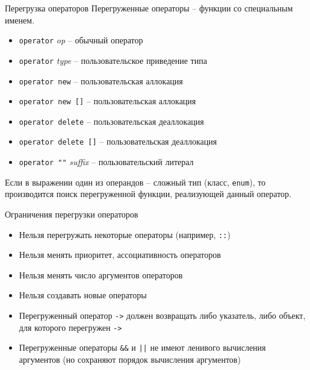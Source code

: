 \documentclass[unknownkeysallowed,xcolor=table]{beamer}
\begin{document}
\begin{frame}{Перегрузка операторов}
Перегруженные операторы -- функции со специальным именем.

\vspace{1em}

\begin{itemize}
  \item \lstinline{operator} \emph{op} -- обычный оператор
  \item \lstinline{operator} \emph{type} -- пользовательское приведение типа
  \item \lstinline{operator new} -- пользовательская аллокация
  \item \lstinline{operator new []} -- пользовательская аллокация
  \item \lstinline{operator delete} -- пользовательская деаллокация
  \item \lstinline{operator delete []} -- пользовательская деаллокация
  \item \lstinline{operator ""} \emph{suffix} -- пользовательский литерал
\end{itemize}

\vspace{1em}

Если в выражении один из операндов -- сложный тип (класс, \lstinline{enum}), то производится поиск перегруженной функции, реализующей данный оператор.

\end{frame}

\begin{frame}{Ограничения перегрузки операторов}

\begin{itemize}
  \item Нельзя перегружать некоторые операторы (например, \lstinline{::}) \vspace{0.5em}
  \item Нельзя менять приоритет, ассоциативность операторов \vspace{0.5em}
  \item Нельзя менять число аргументов операторов \vspace{0.5em}
  \item Нельзя создавать новые операторы \vspace{0.5em}
  \item Перегруженный оператор \lstinline{->} должен возвращать либо указатель, либо объект, для которого перегружен \lstinline{->} \vspace{0.5em}
  \item Перегруженные операторы \lstinline{&&} и \lstinline{||} не имеют ленивого вычисления аргументов (но сохраняют порядок вычисления аргументов)
\end{itemize}

\end{frame}
\end{document}
